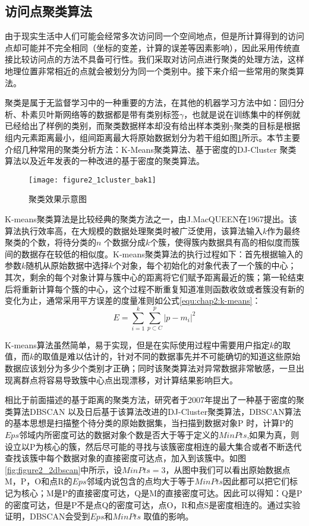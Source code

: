 \subsection{访问点聚类算法}
由于现实生活中人们可能会经常多次访问同一个空间地点，但是所计算得到的访问点却可能并不完全相同（坐标的变差，计算的误差等因素影响），因此采用传统直接比较访问点的方法不具备可行性。我们采取对访问点进行聚类的处理方法，这样地理位置非常相近的点就会被划分为同一个类别中。接下来介绍一些常用的聚类算法。
\par 聚类是属于无监督学习中的一种重要的方法，在其他的机器学习方法中如：回归分析、朴素贝叶斯网络等的数据都是带有类别标签$\gamma$，也就是说在训练集中的样例就已经给出了样例的类别，而聚类数据样本却没有给出样本类别$\gamma$聚类的目标是根据组内元素距离最小，组间距离最大将原始数据划分为若干组如图\ref{figure2_1cluster}所示。本节主要介绍几种常用的聚类分析方法：K-Means聚类算法、基于密度的DJ-Cluster 聚类算法以及近年发表的一种改进的基于密度的聚类算法。
\begin{figure}[htp]
\centering
\texttt{[image: figure2\_1cluster\_bak1]}
\caption{聚类效果示意图}
\label{figure2_1cluster}
\end{figure}
\par  K-means聚类算法是比较经典的聚类方法之一，由J.MacQUEEN在1967提出。该算法执行效率高，在大规模的数据处理聚类时被广泛使用，该算法输入$k$作为最终聚类的个数，将待分类的$n$ 个数据分成$k$个簇，使得簇内数据具有高的相似度而簇间的数据存在较低的相似度。K-means聚类算法的执行过程如下：首先根据输入的参数$k$随机从原始数据中选择$k$个对象，每个初始化的对象代表了一个簇的中心；其次，剩余的每个对象计算与簇中心的距离将它们赋予距离最近的簇；第一轮结束后将重新计算每个簇的中心，这个过程不断重复知道准则函数收敛或者簇没有新的变化为止，通常采用平方误差的度量准则如公式\ref{equ:chap2:k-means}：
\begin{equation}
\label{equ:chap2:k-means}
E=\sum_{i=1}^{k}\sum_{p\subset C}^{p}{\left | p-m_{i} \right |^{2}}
\end{equation}
\par K-means算法虽然简单，易于实现，但是在实际使用过程中需要用户指定$k$的取值，而$k$的取值是难以估计的，针对不同的数据事先并不可能确切的知道这些原始数据应该划分为多少个类别才正确；同时该聚类算法对异常数据非常敏感，一旦出现离群点将容易导致簇中心点出现漂移，对计算结果影响巨大。
\par 相比于前面描述的基于距离的聚类方法，研究者于2007年提出了一种基于密度的聚类算法DBSCAN 以及日后基于该算法改进的DJ-Cluster聚类算法，DBSCAN算法的基本思想是扫描整个待分类的原始数据集，当扫描到数据对象P 时，计算P的$Eps$邻域内所密度可达的数据对象个数是否大于等于定义的$MinPts$,如果为真，则设立以P为核心的簇，然后尽可能的寻找与该簇密度相连的最大集合或者不断迭代查找该簇中每个数据对象的直接密度可达点，加入到该簇中。如图\ref{fig:figure2_2dbscan}中所示，设$MinPts=3$，从图中我们可以看出原始数据点M，P，O和点R的$Eps$邻域内说包含的点均大于等于$MinPts$因此都可以把它们标记为核心；M是P的直接密度可达，Q是M的直接密度可达。因此可以得知：Q是P 的密度可达，但是P不是点Q的密度可达，点O，R和点S是密度相连的。通过实验证明，DBSCAN会受到$Eps$和$MinPts$ 取值的影响。
